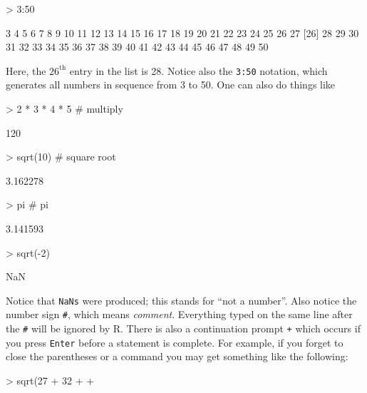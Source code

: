 \documentclass[english]{article}
\renewenvironment{Schunk}{\vspace{\topsep}}{\vspace{\topsep}}
\begin{document}
\begin{Schunk}
\begin{Sinput}
> 3:50
\end{Sinput}
\begin{Soutput}
 [1]  3  4  5  6  7  8  9 10 11 12 13 14 15 16 17 18 19 20 21 22 23 24 25 26 27
[26] 28 29 30 31 32 33 34 35 36 37 38 39 40 41 42 43 44 45 46 47 48 49 50
\end{Soutput}
\end{Schunk}


Here, the $26^{\mathrm{th}}$ entry in the list is 28. Notice also
the \texttt{3:50} notation, which generates all numbers in sequence
from 3 to 50. One can also do things like

\begin{Schunk}
\begin{Sinput}
> 2 * 3 * 4 * 5  # multiply
\end{Sinput}
\begin{Soutput}
[1] 120
\end{Soutput}
\begin{Sinput}
> sqrt(10)       # square root
\end{Sinput}
\begin{Soutput}
[1] 3.162278
\end{Soutput}
\begin{Sinput}
> pi             # pi
\end{Sinput}
\begin{Soutput}
[1] 3.141593
\end{Soutput}
\begin{Sinput}
> sqrt(-2)
\end{Sinput}
\begin{Soutput}
[1] NaN
\end{Soutput}
\end{Schunk}


Notice that \texttt{NaNs} were produced; this stands for ``not
a number''. Also notice the number sign \texttt{\#}, which means
\emph{comment}. Everything typed on the same line after the \texttt{\#}
will be ignored by \textsf{R}. There is also a continuation prompt
\texttt{+} which occurs if you press \texttt{Enter} before a statement
is complete. For example, if you forget to close the parentheses or
a command you may get something like the following:

\begin{Schunk}
\begin{Sinput}
> sqrt(27 + 32
+
+
\end{Sinput}
\end{Schunk}
\end{document}

